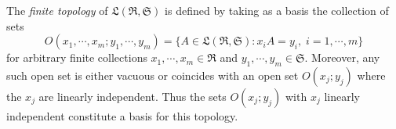 The \textit{finite topology} of $\mathfrak{L}(\mathfrak{R}, \mathfrak{S})$ is defined by taking as a basis the collection of sets
$$O(x_1, \cdots, x_m; y_1, \cdots, y_m) = \{ A \in \mathfrak{L}(\mathfrak{R}, \mathfrak{S}) : x_i A = y_i, \; i = 1, \cdots, m \}$$
for arbitrary finite collections $x_1, \cdots, x_m \in \mathfrak{R}$ and $y_1, \cdots, y_m \in \mathfrak{S}$. Moreover, any such open set is either vacuous or coincides with an open set $O(x_j; y_j)$ where the $x_j$ are linearly independent. Thus the sets $O(x_j; y_j)$ with $x_j$ linearly independent constitute a basis for this topology.
